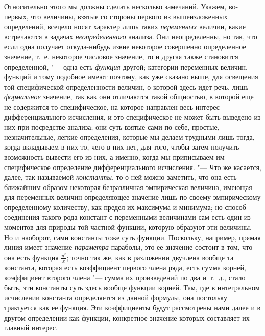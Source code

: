 Относительно этого мы должны сделать несколько замечаний. Укажем, во-первых,
что величины, взятые со стороны первого из вышеизложенных определений, всецело
носят характер лишь таких {\em переменных} величин, какие встречаются в задачах
{\em неопределенного} анализа. Они неопределенны, но так, что если одна
получает откуда-нибудь извне некоторое совершенно определенное значение, т.~е.
некоторое числовое значение, то и другая также становится определенной, "---
одна есть {\em функция} другой; категории переменных величин, функций и тому
подобное имеют поэтому, как уже сказано выше, для освещения той специфической
определенности величин, о которой здесь идет речь, лишь {\em формальное}
значение, так как они отличаются такой общностью, в которой еще не содержится
то специфическое, на которое направлен весь интерес дифференциального
исчисления, и это специфическое не может быть выведено из них при посредстве
анализа; они суть взятые сами по себе, простые, незначительные, легкие
определения, которые мы делаем трудными лишь тогда, когда вкладываем в них то,
чего в них нет, для того, чтобы затем получить возможность вывести его из них,
а именно, когда мы приписываем им специфическое определение дифференциального
исчисления. "--- Что же касается, далее, так называемой {\em константы}, то о
ней можно заметить, что она есть ближайшим образом некоторая безразличная
эмпирическая величина, имеющая для переменных величин определяющее значение
лишь по своему эмпирическому определенному количеству, как предел их максимума
и минимума; но способ соединения такого рода констант с переменными величинами
сам есть один из моментов для природы той частной функции, которую образуют эти
величины. Но и наоборот, сами константы тоже суть функции. Поскольку, например,
прямая линия имеет значение {\em параметра} параболы, это ее значение состоит в
том, что она есть функция $\frac{y^2}x$; точно так же, как в разложении
двучлена вообще та константа, которая есть коэффициент первого члена ряда, есть
сумма корней, коэффициент второго члена "--- сумма их произведений по два
и~т.~д., стало быть, эти константы суть здесь вообще функции корней. Там, где в
интегральном исчислении константа определяется из данной формулы, она постольку
трактуется как ее функция. Эти коэффициенты будут рассмотрены нами далее и в
другом определении как функции, конкретное значение которых составляет их
главный интерес.

